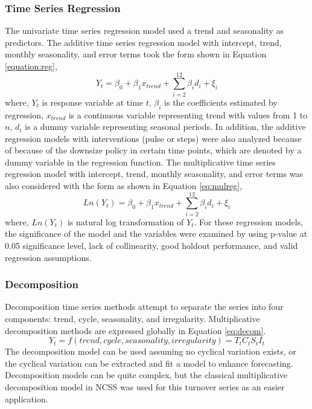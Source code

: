 \subsubsection{Time Series Regression}
The univariate time series regression model used a trend and seasonality as predictors. The additive time series regression model with intercept, trend, monthly seasonality, and error terms took the form shown in Equation \ref{equation:reg},
\begin{equation}
	\label{equation:reg}
	Y_t = \beta_0+\beta_1 x_{trend} + \sum_{i=2}^{12} {\beta_i d_i}+\xi_i
\end{equation}
where, $Y_t$ is response variable at time $t$,  $\beta_i$ is the coefficients estimated by regression, $x_{trend}$ is a continuous variable representing trend with values from 1 to $n$, $d_i$ is a dummy variable representing seasonal periods. In addition, the additive regression models with interventions (pulse or steps) were also analyzed because of because of the downsize policy in certain time points, which are denoted by a dummy variable in the regression function. The multiplicative time series regression model with intercept, trend, monthly seasonality, and error terms was also considered with the form as shown in Equation \ref{eq:mulreg},
\begin{equation}
	\label{eq:mulreg}
	Ln(Y_t)=\beta_0+\beta_1 x_{trend} +\sum_{i=2}^{12} {\beta_i d_i}+\xi_i                              
\end{equation}
where, $Ln(Y_t)$ is natural log transformation of $Y_t$. For these regression models, the significance of the model and the variables were examined by using p-value at 0.05 significance level, lack of collinearity, good holdout performance, and valid regression assumptions. 
\subsubsection{Decomposition}
Decomposition time series methods attempt to separate the series into four components: trend, cycle, seasonality, and irregularity. Multiplicative decomposition methods are expressed globally in Equation \ref{eq:decom}.  
\begin{equation}
	\label{eq:decom}
	Y_t  =f(trend,cycle,seasonality,irregularity)=T_t  C_t S_t I_t            
\end{equation}
The decomposition model can be used assuming no cyclical variation exists, or the cyclical variation can be extracted and fit a model to enhance forecasting. Decomposition models can be quite complex, but the classical multiplicative decomposition model in NCSS was used for this turnover series as an easier application.

